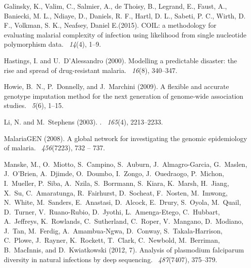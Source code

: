 \documentclass{bioinfo}
\begin{document}
\begin{thebibliography}{}
Galinsky, K., Valim, C., Salmier, A., de Thoisy, B., Legrand, E., Faust, A., Baniecki, M. L., Ndiaye, D., Daniels, R. F., Hartl, D. L., Sabeti, P. C., Wirth, D. F., Volkman, S. K., Neafsey, Daniel E.(2015).
\newblock COIL: a methodology for evaluating malarial complexity of infection using likelihood from single nucleotide polymorphism data.
~{\em14\/}(4), 1--9.

Hastings, I. and U.~D'Alessandro (2000).
\newblock Modelling a predictable disaster: the rise and spread of
  drug-resistant malaria.
~{\em 16\/}(8), 340--347.

Howie, B.~N., P.~Donnelly, and J.~Marchini (2009).
\newblock A flexible and accurate genotype imputation method for the next
  generation of genome-wide association studies.
~{\em 5\/}(6), 1--15.

Li, N. and M.~Stephens (2003).
.
~{\em 165\/}(4), 2213--2233.

MalariaGEN (2008).
\newblock A global network for investigating the genomic epidemiology of
  malaria.
~{\em 456\/}(7223), 732 -- 737.

Manske, M., O.~Miotto, S.~Campino, S.~Auburn, J.~Almagro-Garcia, G.~Maslen,
  J.~O'Brien, A.~Djimde, O.~Doumbo, I.~Zongo, J.~Ouedraogo, P.~Michon,
  I.~Mueller, P.~Siba, A.~Nzila, S.~Borrmann, S.~Kiara, K.~Marsh, H.~Jiang,
  X.~Su, C.~Amaratunga, R.~Fairhurst, D.~Socheat, F.~Nosten, M.~Imwong,
  N.~White, M.~Sanders, E.~Anastasi, D.~Alcock, E.~Drury, S.~Oyola, M.~Quail,
  D.~Turner, V.~Ruano-Rubio, D.~Jyothi, L.~Amenga-Etego, C.~Hubbart,
  A.~Jeffreys, K.~Rowlands, C.~Sutherland, C.~Roper, V.~Mangano, D.~Modiano,
  J.~Tan, M.~Ferdig, A.~Amambua-Ngwa, D.~Conway, S.~Takala-Harrison, C.~Plowe,
  J.~Rayner, K.~Rockett, T.~Clark, C.~Newbold, M.~Berriman, B.~MacInnis, and
  D.~Kwiatkowski (2012, 7).
\newblock Analysis of plasmodium falciparum diversity in natural infections by
  deep sequencing.
~{\em 487\/}(7407), 375--379.


\end{thebibliography}
\end{document}
